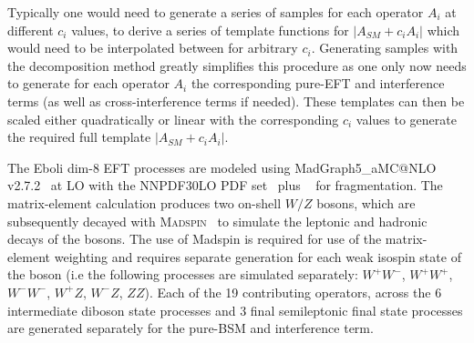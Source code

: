 Typically one would need to generate a series of samples for each operator $A_i$ at different $c_i$ values, to derive a series of template functions for $|A_{SM}+c_iA_i|$ which would need to be interpolated between for arbitrary $c_i$. Generating samples with the decomposition method greatly simplifies this procedure as one only now needs to generate for each operator $A_i$ the corresponding pure-EFT and interference terms (as well as cross-interference terms if needed). These templates can then be scaled either quadratically or linear with the corresponding $c_i$ values to generate the required full template $|A_{SM}+c_iA_i|$.

The Eboli dim-8 EFT processes are modeled using MadGraph5\_aMC@NLO v2.7.2~\cite{Alwall:2014hca} at LO with the  \textsc{NNPDF30LO} PDF set~\cite{Ball:2012cx} plus ~\cite{Sjostrand:2007gs} for fragmentation.
The matrix-element calculation produces two on-shell $W/Z$ bosons, which are subsequently decayed with \textsc{Madspin}~\cite{Artoisenet:2012st} to simulate the leptonic and hadronic decays of the bosons.
The use of Madspin is required for use of the matrix-element weighting and requires separate generation for each weak isospin state of the boson (i.e the following processes are simulated separately: $W^+W^-$, $W^+W^+$, $W^-W^-$, $W^+Z$, $W^-Z$, $ZZ$).
Each of the 19 contributing operators, across the 6 intermediate diboson state processes and 3 final semileptonic final state processes are generated separately for the pure-BSM and interference term.



